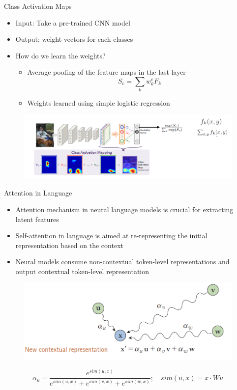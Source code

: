 \documentclass[11pt,compress,t,notes=noshow, aspectratio=169, xcolor=table]{beamer}
\begin{document}
\begin{frame}{Class Activation Maps}
    \begin{itemize}
        \item Input: Take a pre-trained CNN model
        \item Output: weight vectors for each classes
        \item How do we learn the weights?
        \begin{itemize}
            \item Average pooling of the feature maps in the last layer
            \begin{equation*}
                S_c = \sum\limits_k w_k^c F_k
            \end{equation*}
            \item Weights learned using simple logistic regression
        \end{itemize}
    \end{itemize}
    \begin{figure}
        \centering
        \includegraphics[scale=.35]{bild11}
    \end{figure}
\end{frame}

\begin{frame}{Attention in Language}
    \begin{itemize}
        \item Attention mechanism in neural language models is crucial for extracting latent features
        \item Self-attention in language is aimed at re-representing the initial representation based on
the context
\item Neural models consume non-contextual token-level representations and output
contextual token-level representation
    \end{itemize}
    \begin{figure}
        \centering
        \includegraphics[width=0.4\linewidth]{bild12}
    \end{figure}
    \pause
    \begin{equation*}
        \alpha_u  = \frac{e^{sim(u,x)}}{e^{sim(u,x)} + e^{sim(v,x)} + e^{sim(w,x)}}; \quad sim(u,x) = x\cdot Wu
    \end{equation*}
\end{frame}
\end{document}
